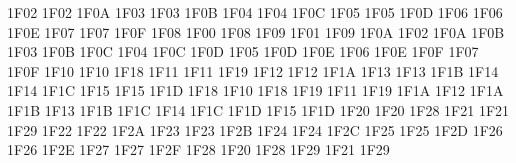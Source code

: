\setcclcuc 1F02 1F02 1F0A %
\setcclcuc 1F03 1F03 1F0B %
\setcclcuc 1F04 1F04 1F0C %
\setcclcuc 1F05 1F05 1F0D %
\setcclcuc 1F06 1F06 1F0E %
\setcclcuc 1F07 1F07 1F0F %
\setcclcuc 1F08 1F00 1F08 %
\setcclcuc 1F09 1F01 1F09 %
\setcclcuc 1F0A 1F02 1F0A %
\setcclcuc 1F0B 1F03 1F0B %
\setcclcuc 1F0C 1F04 1F0C %
\setcclcuc 1F0D 1F05 1F0D %
\setcclcuc 1F0E 1F06 1F0E %
\setcclcuc 1F0F 1F07 1F0F %
\setcclcuc 1F10 1F10 1F18 %
\setcclcuc 1F11 1F11 1F19 %
\setcclcuc 1F12 1F12 1F1A %
\setcclcuc 1F13 1F13 1F1B %
\setcclcuc 1F14 1F14 1F1C %
\setcclcuc 1F15 1F15 1F1D %
\setcclcuc 1F18 1F10 1F18 %
\setcclcuc 1F19 1F11 1F19 %
\setcclcuc 1F1A 1F12 1F1A %
\setcclcuc 1F1B 1F13 1F1B %
\setcclcuc 1F1C 1F14 1F1C %
\setcclcuc 1F1D 1F15 1F1D %
\setcclcuc 1F20 1F20 1F28 %
\setcclcuc 1F21 1F21 1F29 %
\setcclcuc 1F22 1F22 1F2A %
\setcclcuc 1F23 1F23 1F2B %
\setcclcuc 1F24 1F24 1F2C %
\setcclcuc 1F25 1F25 1F2D %
\setcclcuc 1F26 1F26 1F2E %
\setcclcuc 1F27 1F27 1F2F %
\setcclcuc 1F28 1F20 1F28 %
\setcclcuc 1F29 1F21 1F29 %
